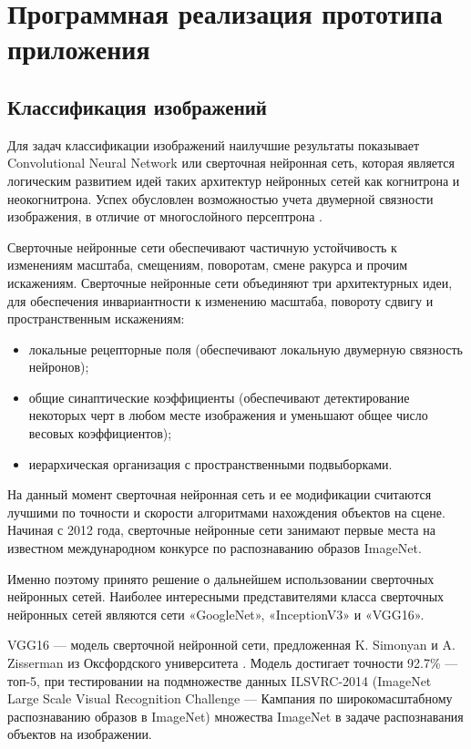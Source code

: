 \sectioncounter
\section{Программная реализация прототипа приложения}

\subsection{Классификация изображений}

Для задач классификации изображений наилучшие результаты показывает Convolutional Neural Network или сверточная нейронная сеть, которая является логическим развитием идей таких архитектур нейронных сетей как когнитрона и неокогнитрона. 
Успех обусловлен возможностью учета двумерной связности изображения, в отличие от многослойного персептрона \cite{conv-neoro}. 

Сверточные нейронные сети обеспечивают частичную устойчивость к изменениям масштаба, смещениям, поворотам, смене ракурса и прочим искажениям. 
Сверточные нейронные сети объединяют три архитектурных идеи, для обеспечения инвариантности к изменению масштаба, повороту сдвигу и пространственным искажениям:
\begin{itemize}
    \item локальные рецепторные поля (обеспечивают локальную двумерную связность нейронов);
    \item общие синаптические коэффициенты (обеспечивают детектирование некоторых черт в любом месте изображения и уменьшают общее число весовых коэффициентов);
    \item иерархическая организация с пространственными подвыборками.
\end{itemize}

На данный момент сверточная нейронная сеть и ее модификации считаются лучшими по точности и скорости алгоритмами нахождения объектов на сцене. 
Начиная с 2012 года, сверточные нейронные сети занимают первые места на известном международном конкурсе по распознаванию образов ImageNet.

Именно поэтому принято решение о дальнейшем использовании сверточных нейронных сетей. 
Наиболее интересными представителями класса сверточных нейронных сетей являются сети «GoogleNet», «InceptionV3» и «VGG16».

VGG16 — модель сверточной нейронной сети, предложенная K. Simonyan и A. Zisserman из Оксфордского университета \cite{vgg16alg}. 
Модель достигает точности 92.7\% — топ-5, при тестировании на подмножестве данных ILSVRC-2014 (ImageNet Large Scale Visual Recognition Challenge — Кампания по широкомасштабному распознаванию образов в ImageNet) множества ImageNet в задаче распознавания объектов на изображении. 

